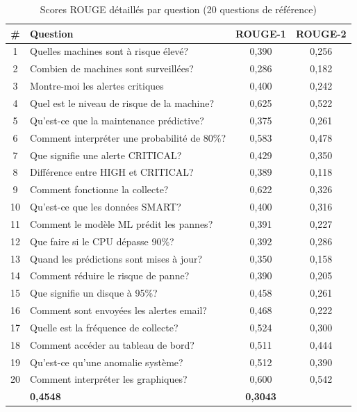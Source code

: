 \begin{table}[H]
\centering
\caption{Scores ROUGE détaillés par question (20 questions de référence)}
\begin{tabularx}{\textwidth}{|c|X|c|c|}
\hline
\rowcolor{lightblue}
\textbf{\#} & \textbf{Question} & \textbf{ROUGE-1} & \textbf{ROUGE-2} \\
\hline
1  & Quelles machines sont à risque élevé?          & 0,390 & 0,256 \\
\hline
2  & Combien de machines sont surveillées?           & 0,286 & 0,182 \\
\hline
3  & Montre-moi les alertes critiques               & 0,400 & 0,242 \\
\hline
4  & Quel est le niveau de risque de la machine?    & 0,625 & 0,522 \\
\hline
5  & Qu'est-ce que la maintenance prédictive?       & 0,375 & 0,261 \\
\hline
6  & Comment interpréter une probabilité de 80\%?  & 0,583 & 0,478 \\
\hline
7  & Que signifie une alerte CRITICAL?              & 0,429 & 0,350 \\
\hline
8  & Différence entre HIGH et CRITICAL?             & 0,389 & 0,118 \\
\hline
9  & Comment fonctionne la collecte?                & 0,622 & 0,326 \\
\hline
10 & Qu'est-ce que les données SMART?               & 0,400 & 0,316 \\
\hline
11 & Comment le modèle ML prédit les pannes?        & 0,391 & 0,227 \\
\hline
12 & Que faire si le CPU dépasse 90\%?              & 0,392 & 0,286 \\
\hline
13 & Quand les prédictions sont mises à jour?       & 0,350 & 0,158 \\
\hline
14 & Comment réduire le risque de panne?            & 0,390 & 0,205 \\
\hline
15 & Que signifie un disque à 95\%?                 & 0,458 & 0,261 \\
\hline
16 & Comment sont envoyées les alertes email?       & 0,468 & 0,222 \\
\hline
17 & Quelle est la fréquence de collecte?           & 0,524 & 0,300 \\
\hline
18 & Comment accéder au tableau de bord?            & 0,511 & 0,444 \\
\hline
19 & Qu'est-ce qu'une anomalie système?             & 0,512 & 0,390 \\
\hline
20 & Comment interpréter les graphiques?            & 0,600 & 0,542 \\
\hline
\rowcolor{lightblue}
\multicolumn{2}{|c|}{\textbf{MOYENNE}} & \textbf{0,4548} & \textbf{0,3043} \\
\hline
\end{tabularx}
\end{table}

